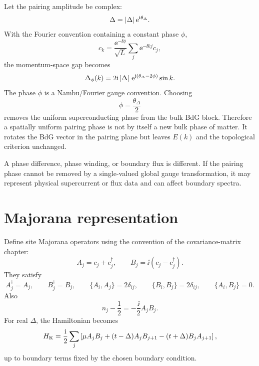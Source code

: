 Let the pairing amplitude be complex:
\begin{equation}
\label{eq:kitaev-complex-delta}
    \Delta=\left|\Delta\right|\mathrm{e}^{\mathrm{i}\theta_\Delta}.
\end{equation}
With the Fourier convention containing a constant phase $\phi$,
\begin{equation}
    c_k=\frac{\ee^{-\ii\phi}}{\sqrt{L}}
    \sum_j\ee^{-\ii kj}c_j,
\end{equation}
the momentum-space gap becomes
\begin{equation}
\label{eq:kitaev-complex-gap-fourier-phase}
    \Delta_\phi(k)
    =
    2\mathrm{i}\left|\Delta\right|\,
    \mathrm{e}^{\mathrm{i}(\theta_\Delta-2\phi)}\sin k.
\end{equation}
The phase $\phi$ is a Nambu/Fourier gauge convention.  Choosing
\begin{equation}
\label{eq:kitaev-gauge-remove-uniform-phase}
    \phi=\frac{\theta_\Delta}{2}
\end{equation}
removes the uniform superconducting phase from the bulk BdG block.  Therefore a
spatially uniform pairing phase is not by itself a new bulk phase of matter.  It
rotates the BdG vector in the pairing plane but leaves $E(k)$ and the topological
criterion unchanged.

A phase difference, phase winding, or boundary flux is different.  If the pairing
phase cannot be removed by a single-valued global gauge transformation, it may
represent physical supercurrent or flux data and can affect boundary spectra.

\section{Majorana representation}
\label{sec:kitaev-majorana-representation}

Define site Majorana operators using the convention of the covariance-matrix
chapter:
\begin{equation}
\label{eq:kitaev-majorana-definitions}
    A_j=c_j+c_j^\dagger,
    \qquad
    B_j=\ii(c_j-c_j^\dagger).
\end{equation}
They satisfy
\begin{equation}
    A_j^\dagger=A_j,
    \qquad
    B_j^\dagger=B_j,
    \qquad
    \{A_i,A_j\}=2\delta_{ij},
    \qquad
    \{B_i,B_j\}=2\delta_{ij},
    \qquad
    \{A_i,B_j\}=0.
\end{equation}
Also
\begin{equation}
\label{eq:kitaev-density-majorana}
    n_j-\frac12=-\frac{\ii}{2}A_jB_j.
\end{equation}
For real $\Delta$, the Hamiltonian becomes
\begin{equation}
\label{eq:kitaev-majorana-hamiltonian}
    H_{\rm K}
    =
    \frac{\mathrm{i}}{2}\sum_j
    \left[
        \mu A_jB_j
        +(t-\Delta)A_jB_{j+1}
        -(t+\Delta)B_jA_{j+1}
    \right],
\end{equation}
up to boundary terms fixed by the chosen boundary condition.

